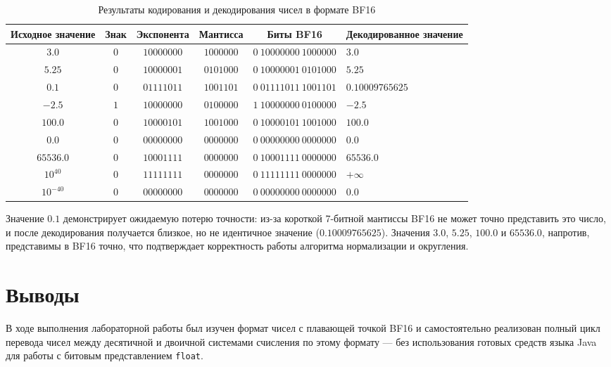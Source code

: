 \documentclass[12pt,a4paper]{article}
\begin{document}
\begin{table}[h]
\centering
\caption{Результаты кодирования и декодирования чисел в формате BF16}
\label{tab:results}
\small
\begin{tabular}{@{}c c c c c p{3.0cm}@{}}
\toprule
Исходное значение &
Знак &
Экспонента &
Мантисса &
Биты BF16 &
Декодированное значение \\
\midrule

$3.0$
& $0$
& $10000000$
& $1000000$
& $0\ 10000000\ 1000000$
& $3.0$ \\

$5.25$
& $0$
& $10000001$
& $0101000$
& $0\ 10000001\ 0101000$
& $5.25$ \\

$0.1$
& $0$
& $01111011$
& $1001101$
& $0\ 01111011\ 1001101$
& $0.10009765625$ \\

$-2.5$
& $1$
& $10000000$
& $0100000$
& $1\ 10000000\ 0100000$
& $-2.5$ \\

$100.0$
& $0$
& $10000101$
& $1001000$
& $0\ 10000101\ 1001000$
& $100.0$ \\

$0.0$
& $0$
& $00000000$
& $0000000$
& $0\ 00000000\ 0000000$
& $0.0$ \\

$65536.0$
& $0$
& $10001111$
& $0000000$
& $0\ 10001111\ 0000000$
& $65536.0$ \\

$10^{40}$
& $0$
& $11111111$
& $0000000$
& $0\ 11111111\ 0000000$
& $+\infty$ \\

$10^{-40}$
& $0$
& $00000000$
& $0000000$
& $0\ 00000000\ 0000000$
& $0.0$ \\

\bottomrule
\end{tabular}
\end{table}

Значение $0.1$ демонстрирует ожидаемую потерю точности: из-за короткой
7-битной мантиссы BF16 не может точно представить это число, и после
декодирования получается близкое, но не идентичное значение
($0.10009765625$). Значения $3.0$, $5.25$, $100.0$ и $65536.0$, напротив,
представимы в BF16 точно, что подтверждает корректность работы алгоритма
нормализации и округления.

\section{Выводы}

В ходе выполнения лабораторной работы был изучен формат чисел с плавающей
точкой BF16 и самостоятельно реализован полный цикл перевода чисел между
десятичной и двоичной системами счисления по этому формату — без
использования готовых средств языка Java для работы с битовым
представлением \texttt{float}.
\end{document}
